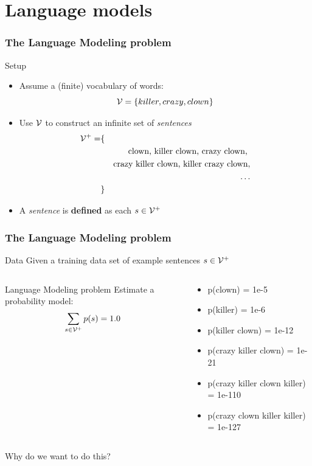 



\section{Language models}

\begin{frame}
\frametitle{The Language Modeling problem}
\begin{block}{Setup}
\begin{itemize}[<+->]
\item Assume a (finite) vocabulary of words:
\[ {\cal V} = \{ killer, crazy, clown \} \]
\item Use ${\cal V}$ to construct an infinite set of \textit{sentences} 
\begin{eqnarray*} 
{\cal V}^+ = & \{ & \\
&& \mbox{clown, killer clown, crazy clown, } \\
&& \mbox{crazy killer clown, killer crazy clown}, \\
&& \ldots \\
& \} &
\end{eqnarray*}
\item A \textit{sentence} is \textbf{defined} as each $s \in {\cal V}^+$
\end{itemize}
\end{block}
\end{frame}

\begin{frame}
\frametitle{The Language Modeling problem}
\begin{block}{Data}
Given a training data set of example sentences $s \in {\cal V}^+$
\end{block}
\pause
\begin{columns}
    \begin{block}{Language Modeling problem}
    Estimate a probability model:
    \[ \sum_{s \in {\cal V}^+} p(s) = 1.0 \]
    \end{block}
    \begin{block}{}
    \begin{itemize}
    \item p(clown) = 1e-5
    \item p(killer) = 1e-6
    \item {\small p(killer clown) = 1e-12}
    \item {\footnotesize p(crazy killer clown) = 1e-21}
    \item {\tiny p(crazy killer clown killer) = 1e-110}
    \item {\tiny p(crazy clown killer killer) = 1e-127}
    \end{itemize}
    \end{block}
\end{columns}
\begin{alertblock}{Why do we want to do this?}
\end{alertblock}
\end{frame}

